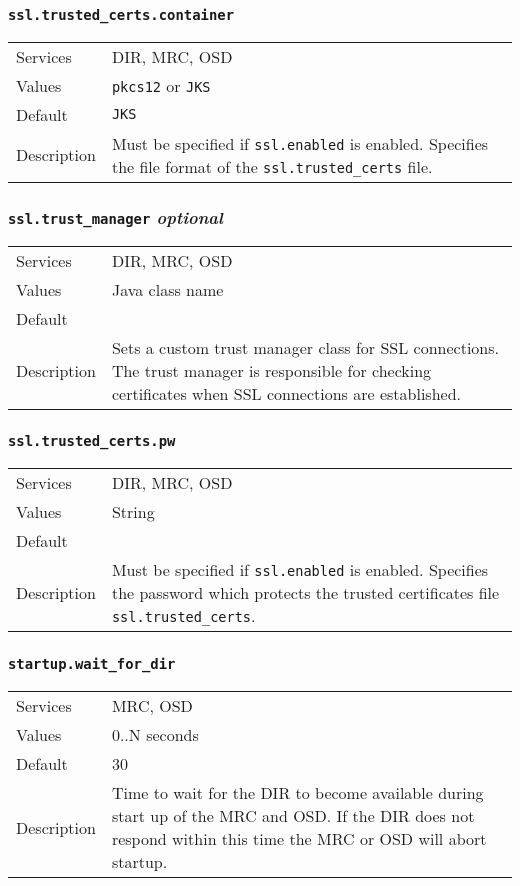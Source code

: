 \documentclass[a4paper,10pt]{book}
\begin{document}
\subsubsection{\texttt{ssl.trusted\_certs.container}}
\begin{tabular}{lp{10cm}}
 Services & DIR, MRC, OSD\\
 Values   & \texttt{pkcs12} or \texttt{JKS}\\
 Default  & \texttt{JKS}\\
 Description & Must be specified if \texttt{ssl.enabled} is enabled. Specifies the file format of the \texttt{ssl.trusted\_certs} file.
\end{tabular}

\subsubsection{\texttt{ssl.trust\_manager} \textit{optional}}
\begin{tabular}{lp{10cm}}
 Services & DIR, MRC, OSD\\
 Values   & Java class name\\
 Default  & \\
 Description & Sets a custom trust manager class for SSL connections. The trust manager is responsible for checking certificates when SSL connections are established.
\end{tabular}

\subsubsection{\texttt{ssl.trusted\_certs.pw}}
\begin{tabular}{lp{10cm}}
 Services & DIR, MRC, OSD\\
 Values   & String\\
 Default  & \\
 Description & Must be specified if \texttt{ssl.enabled} is enabled. Specifies the password which protects the trusted certificates file \texttt{ssl.trusted\_certs}.
\end{tabular}

\subsubsection{\texttt{startup.wait\_for\_dir}}
\begin{tabular}{lp{10cm}}
 Services & MRC, OSD\\
 Values   & 0..N seconds\\
 Default  & 30 \\
 Description & Time to wait for the DIR to become available during start up of the MRC and OSD. If the DIR does not respond within this time the MRC or OSD will abort startup.
\end{tabular}
\end{document}
